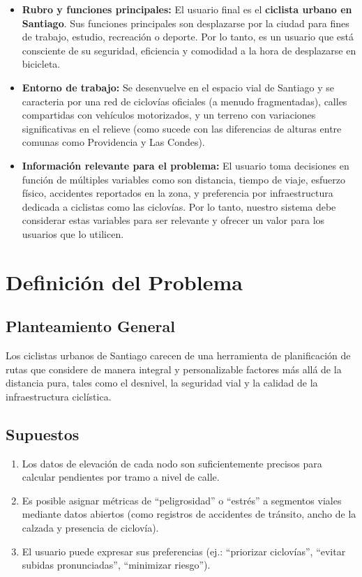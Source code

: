 \documentclass[12pt, a4paper, spanish]{article}
\begin{document}
\begin{itemize}
    \item \textbf{Rubro y funciones principales:} El usuario final es el \textbf{ciclista urbano en Santiago}. Sus funciones principales son desplazarse por la ciudad para fines de trabajo, estudio, recreación o deporte. Por lo tanto, es un usuario que está consciente de su seguridad, eficiencia y comodidad a la hora de desplazarse en bicicleta.

    \item \textbf{Entorno de trabajo:} Se desenvuelve en el espacio vial de Santiago y se caracteria por una red de ciclovías oficiales (a menudo fragmentadas), calles compartidas con vehículos motorizados, y un terreno con variaciones significativas en el relieve (como sucede con las diferencias de alturas entre comunas como Providencia y Las Condes).

    \item \textbf{Información relevante para el problema:} El usuario toma decisiones en función de múltiples variables como son distancia, tiempo de viaje, esfuerzo físico, accidentes reportados en la zona, y preferencia por infraestructura dedicada a ciclistas como las ciclovías. Por lo tanto, nuestro sistema debe considerar estas variables para ser relevante y ofrecer un valor para los usuarios que lo utilicen.
\end{itemize}

\section{Definición del Problema}
\label{sec:problema}

\subsection{Planteamiento General}
Los ciclistas urbanos de Santiago carecen de una herramienta de planificación de rutas que considere de manera integral y personalizable factores más allá de la distancia pura, tales como el desnivel, la seguridad vial y la calidad de la infraestructura ciclística.

\subsection{Supuestos}
\begin{enumerate}
    \item Los datos de elevación de cada nodo son suficientemente precisos para calcular pendientes por tramo a nivel de calle.
    \item Es posible asignar métricas de ``peligrosidad'' o ``estrés'' a segmentos viales mediante datos abiertos (como registros de accidentes de tránsito, ancho de la calzada y presencia de ciclovía).
    \item El usuario puede expresar sus preferencias (ej.: ``priorizar ciclovías'', ``evitar subidas pronunciadas'', ``minimizar riesgo'').
\end{enumerate}
\end{document}

